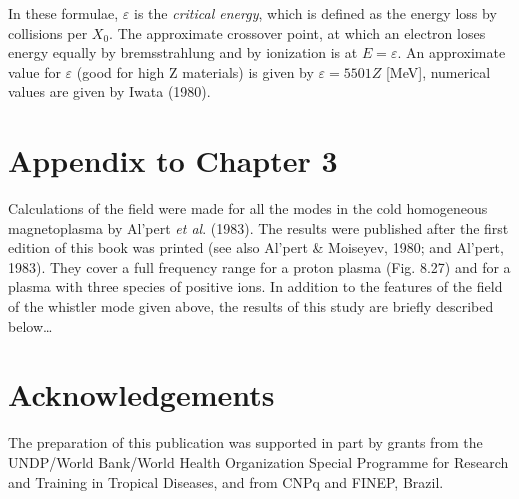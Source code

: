 In these formulae, $\varepsilon$  is the {\it critical energy\/},
which is defined as the energy loss by collisions per $X_0$.
The approximate crossover point, at which an electron loses
energy equally by bremsstrahlung and by ionization is at $ E = \varepsilon$.
An approximate value for $\varepsilon$ (good for high
Z materials) is given by $ \varepsilon = 5501 Z$ [MeV],
numerical values are given by Iwata (1980).

\section*{Appendix to Chapter 3}

Calculations of the field were made for all the modes in the cold
homogeneous magnetoplasma by Al'pert {\it et al}. (1983). The results
were published after the first edition of this book was printed (see
also Al'pert \& Moiseyev, 1980; and Al'pert, 1983). They cover a full
frequency range for a proton plasma (Fig. 8.27) and for a plasma with
three species of positive ions. In addition to the features of the
field of the whistler mode given above, the results of this study are
briefly described below\ldots

\section*{Acknowledgements}

The preparation of this publication was supported in part by grants from
the UNDP/World Bank/World Health Organization Special Programme
for Research and Training in Tropical Diseases, and from CNPq and
FINEP, Brazil.

